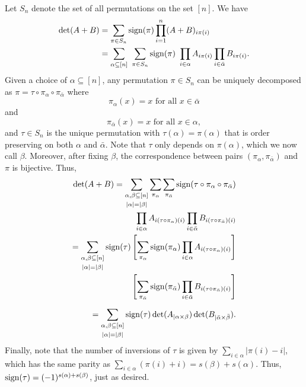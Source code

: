 \documentclass[conference]{IEEEtran}
\begin{document}
\begin{IEEEproof}
Let $S_n$ denote the set of all permutations on the set $[n]$. We have
	\begin{align*}
		\det(A+B) &= \sum_{\pi\in S_n}\sign(\pi)\prod_{i = 1}^n(A+B)_{i\pi(i)}\\
		&= \sum_{\alpha\subseteq [n]}\ \sum_{\pi\in S_n}\sign(\pi)\ \prod_{i \in \alpha} A_{i\pi(i)}\prod_{i \in \bar\alpha} B_{i\pi(i)}.
	\end{align*}
	Given a choice of $\alpha \subseteq [n]$, any permutation $\pi\in S_n$ can be uniquely decomposed as $\pi = \tau\circ\pi_{\alpha}\circ \pi_{\bar\alpha}$ where
	\[
	\pi_{\alpha}(x) = x \text{ for all } x\in\bar\alpha
    \]
    and
    \[\pi_{\bar\alpha}(x) = x \text{ for all } x\in\alpha,
	\]
	and $\tau\in S_n$ is the unique permutation with $\tau(\alpha) = \pi(\alpha)$ that is order preserving on both $\alpha$ and $\bar\alpha$. Note that $\tau$ only depends on $\pi(\alpha)$, which we now call $\beta$. Moreover, after fixing $\beta$, the correspondence between pairs $(\pi_\alpha,\pi_{\bar\alpha})$ and $\pi$ is bijective. Thus,
\allowdisplaybreaks
\begin{align*}
		\det(A+B) = \sum_{\substack{\alpha,\beta\subseteq [n]\\[1mm]|\alpha|=|\beta|}}\sum_{\pi_\alpha}\sum_{\pi_{\bar\alpha}}\operatorname{sign}(\tau\circ \pi_{\alpha}\circ \pi_{\bar\alpha})\\
        \prod_{i \in \alpha} A_{i(\tau\circ \pi_\alpha)(i)}\prod_{i \in \bar\alpha} B_{i(\tau\circ \pi_{\bar\alpha})(i)}\\
		= \sum_{\substack{\alpha,\beta\subseteq [n]\\[1mm]|\alpha|=|\beta|}}\operatorname{sign}(\tau)\left[\sum_{\pi_\alpha}\operatorname{sign}(\pi_{\alpha})\prod_{i \in \alpha} A_{i(\tau\circ \pi_\alpha)(i)}\right]\\
        \left[\sum_{\pi_{\bar\alpha}} \operatorname{sign}(\pi_{\bar\alpha})\prod_{i \in \bar\alpha}B_{i(\tau\circ \pi_{\bar\alpha})(i)}\right]\\[2mm]
		= \sum_{\substack{\alpha,\beta\subseteq [n]\\[1mm]|\alpha|=|\beta|}}\operatorname{sign}(\tau)\det(A_{|\alpha\times \beta})\det(B_{|\bar\alpha\times \bar\beta}).
	\end{align*}
	Finally, note that the number of inversions of $\tau$ is given by
	$\sum_{i\in\alpha}|\pi(i)-i|$, which has the same parity as $\sum_{i\in\alpha}(\pi(i)+i) = s(\beta) + s(\alpha)$.
	Thus, $\operatorname{sign}(\tau) = (-1)^{s(\alpha)+s(\beta)}$, just as desired.
\end{IEEEproof}
\end{document}
